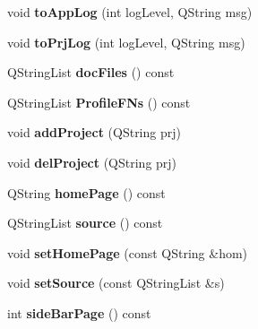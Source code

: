 \begin{DoxyCompactItemize}
\item 
\hypertarget{classConfig_ac18f456b34f405ed23baf93c23e25159}{
void {\bfseries toAppLog} (int logLevel, QString msg)}
\label{classConfig_ac18f456b34f405ed23baf93c23e25159}

\item 
\hypertarget{classConfig_a5dd4006d2077665b1b0d2b383148f259}{
void {\bfseries toPrjLog} (int logLevel, QString msg)}
\label{classConfig_a5dd4006d2077665b1b0d2b383148f259}

\item 
\hypertarget{classConfig_abe591008bafcd67b20393b520e1a7db9}{
QStringList {\bfseries docFiles} () const }
\label{classConfig_abe591008bafcd67b20393b520e1a7db9}

\item 
\hypertarget{classConfig_a2e2260fa4d22c041325c0513d1b6bac4}{
QStringList {\bfseries ProfileFNs} () const }
\label{classConfig_a2e2260fa4d22c041325c0513d1b6bac4}

\item 
\hypertarget{classConfig_aa48c7a278276275a40a71e6d0ac5aaaf}{
void {\bfseries addProject} (QString prj)}
\label{classConfig_aa48c7a278276275a40a71e6d0ac5aaaf}

\item 
\hypertarget{classConfig_ac3979616b541d76831e5f34378835c0c}{
void {\bfseries delProject} (QString prj)}
\label{classConfig_ac3979616b541d76831e5f34378835c0c}

\item 
\hypertarget{classConfig_a302078a51b4e9279ddfb7b9b8731a64a}{
QString {\bfseries homePage} () const }
\label{classConfig_a302078a51b4e9279ddfb7b9b8731a64a}

\item 
\hypertarget{classConfig_a521374a79dd57c675dac912e26aff596}{
QStringList {\bfseries source} () const }
\label{classConfig_a521374a79dd57c675dac912e26aff596}

\item 
\hypertarget{classConfig_a0f41a55bd243d4691bb4f492ab072e57}{
void {\bfseries setHomePage} (const QString \&hom)}
\label{classConfig_a0f41a55bd243d4691bb4f492ab072e57}

\item 
\hypertarget{classConfig_a2cbec495bf45f1887170923bea54126b}{
void {\bfseries setSource} (const QStringList \&s)}
\label{classConfig_a2cbec495bf45f1887170923bea54126b}

\item 
\hypertarget{classConfig_a3412baae9ea55f42be76191777a98b9b}{
int {\bfseries sideBarPage} () const }
\label{classConfig_a3412baae9ea55f42be76191777a98b9b}


\end{DoxyCompactItemize}
